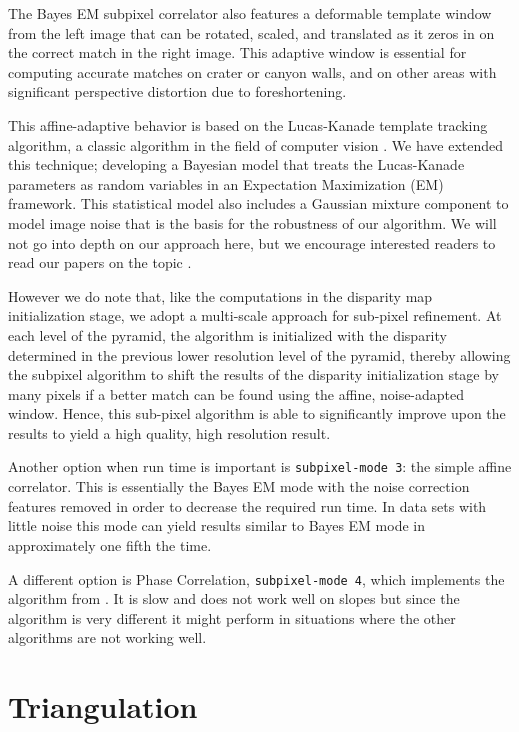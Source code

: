 The Bayes EM subpixel correlator also features a deformable template
window from the left image that can be rotated, scaled, and translated
as it zeros in on the correct match in the right image.  This
adaptive window is essential for computing accurate matches on crater
or canyon walls, and on other areas with significant perspective
distortion due to foreshortening.

This affine-adaptive behavior is based on the Lucas-Kanade template
tracking algorithm, a classic algorithm in the field of computer
vision \citep{Baker04:lucas-kanade}.  We have extended this technique;
developing a Bayesian model that treats the Lucas-Kanade parameters
as random variables in an Expectation Maximization (EM) framework.
This statistical model also includes a Gaussian mixture component
to model image noise that is the basis for the robustness of our
algorithm.  We will not go into depth on our approach here, but we
encourage interested readers to read our papers on the topic
\citep{nefian:bayes_em, broxton:isvc09}.

However we do note that, like the computations in the disparity map
initialization stage, we adopt a multi-scale approach for sub-pixel
refinement. At each level of the pyramid, the algorithm is initialized
with the disparity determined in the previous lower resolution level
of the pyramid, thereby allowing the subpixel algorithm to shift the
results of the disparity initialization stage by many pixels if a better
match can be found using the affine, noise-adapted window.  Hence,
this sub-pixel algorithm is able to significantly improve upon the
results to yield a high quality, high resolution result.

Another option when run time is important is \texttt{subpixel-mode 3}:
the simple affine correlator.  This is essentially the Bayes EM mode
with the noise correction features removed in order to decrease the
required run time.  In data sets with little noise this mode can yield
results similar to Bayes EM mode in approximately one fifth the time.

A different option is Phase Correlation, \texttt{subpixel-mode 4},
which implements the algorithm from \cite{guizar2008efficient}.
It is slow and does not work well on slopes but since the algorithm
is very different it might perform in situations where the other 
algorithms are not working well.

\section{Triangulation}

